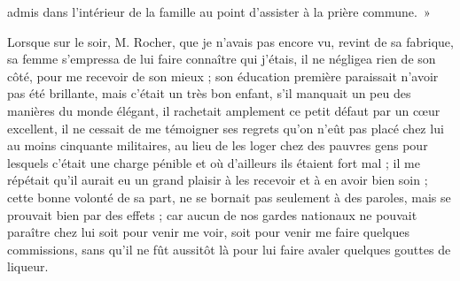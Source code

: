\documentclass[11pt,a4paper]{report}
\begin{document}
admis dans l'intérieur de la famille au point d'assister à la prière commune.~»

Lorsque sur le soir, M. Rocher, que je n'avais pas encore vu, revint de sa fabrique, sa femme s'empressa de lui faire connaître qui j'étais, il ne négligea rien de son côté, pour me recevoir de son mieux ; son éducation première paraissait n'avoir pas été brillante, mais c'était un très bon enfant, s'il manquait un peu des manières du monde élégant, il rachetait amplement ce petit défaut par un cœur excellent, il ne cessait de me témoigner ses regrets qu'on n'eût pas placé chez lui au moins cinquante militaires, au lieu de les loger chez des pauvres gens pour lesquels c'était une charge pénible et où d'ailleurs ils étaient fort mal ; il me répétait qu'il aurait eu un grand plaisir à les recevoir et à en avoir bien soin ; cette bonne volonté de sa part, ne se bornait pas seulement à des paroles, mais se prouvait bien par des effets ; car aucun de nos gardes nationaux ne pouvait paraître chez lui soit pour venir me voir, soit pour venir me faire quelques commissions, sans qu'il ne fût aussitôt là pour lui faire avaler quelques gouttes de liqueur.
\end{document}
